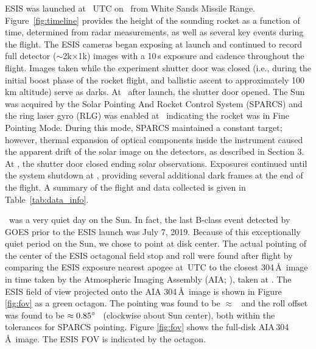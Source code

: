 		ESIS was launched at \timeMissionStart~UTC
		on \dateMission\ from White Sands Missile Range.  Figure~\ref{fig:timeline} provides the height of the sounding rocket as a function of time, determined from %
		radar measurements, as well as several key events during the flight.  
		The ESIS cameras began exposing at launch and continued to record full detector ($\sim$2k$\times$1k) images with a 10\,s exposure and cadence throughout the flight. Images taken while the
		experiment shutter door was closed (i.e., during the initial  boost phase of the rocket flight, and ballistic ascent to approximately 100\,km altitude) serve as darks.  
		At \timeMissionShutterOpen\ after launch, the shutter door %
		opened.  
		The Sun was acquired by the Solar Pointing And Rocket %
		Control System (SPARCS) and the ring laser gyro (RLG) was enabled at \timeMissionRlgEnable\ indicating the rocket was in Fine Pointing Mode.  
		During this mode, SPARCS maintained a constant target; however, thermal expansion of optical components inside the instrument caused the apparent drift of the solar image on the detectors, as described in Section 3.  
		At  \timeMissionShutterClose, the shutter door closed ending solar observations. Exposures continued until the system shutdown at \timeDataStop, providing several additional dark frames at the end of the flight.   A summary of the flight and data collected is given in Table~\ref{tab:data_info}.
		
	    \dateMission\ was a very quiet day on the Sun.  
	    In fact, the last  B-class event detected by GOES \citep{GOES} prior to the ESIS launch was July 7, 2019.  Because of this exceptionally quiet period on the Sun, we chose to point at disk center. 
	    The actual pointing of the center of the ESIS octagonal field stop and roll were found after flight by comparing the ESIS exposure nearest apogee at \timeApogeeFrame\,UTC to the closest 304\,\AA \ image in time taken by the Atmospheric Imaging Assembly (AIA; \citet{lemen2011}), taken at \aianearapogee.  
	    The ESIS field of view projected onto the AIA 304\,\AA\ image is shown in Figure \ref{fig:fov} as a green octagon.  
	    The pointing was found to be $\approx$ \esispointing \ and the roll offset was found to be $\approx 0.85^{\circ}$ \ (clockwise about Sun center), both within the tolerances for SPARCS pointing.  
	    Figure \ref{fig:fov} shows the full-disk AIA\,304\,\AA\ image. 
	    The ESIS FOV is indicated by the octagon.  
	    
